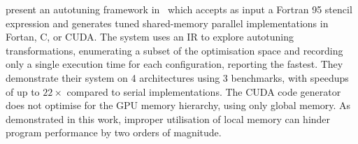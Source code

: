 \documentclass[nonatbib,preprint,10pt]{sigplanconf}
\begin{document}

\citeauthor{Kamil2010} present an autotuning framework
in~\cite{Kamil2010} which accepts as input a Fortran 95 stencil
expression and generates tuned shared-memory parallel implementations
in Fortan, C, or CUDA. The system uses an IR to explore autotuning
transformations, enumerating a subset of the optimisation space and
recording only a single execution time for each configuration,
reporting the fastest. They demonstrate their system on 4
architectures using 3 benchmarks, with speedups of up to $22\times$
compared to serial implementations. The CUDA code generator does not
optimise for the GPU memory hierarchy, using only global memory. As
demonstrated in this work, improper utilisation of local memory can
hinder program performance by two orders of magnitude.

\end{document}
